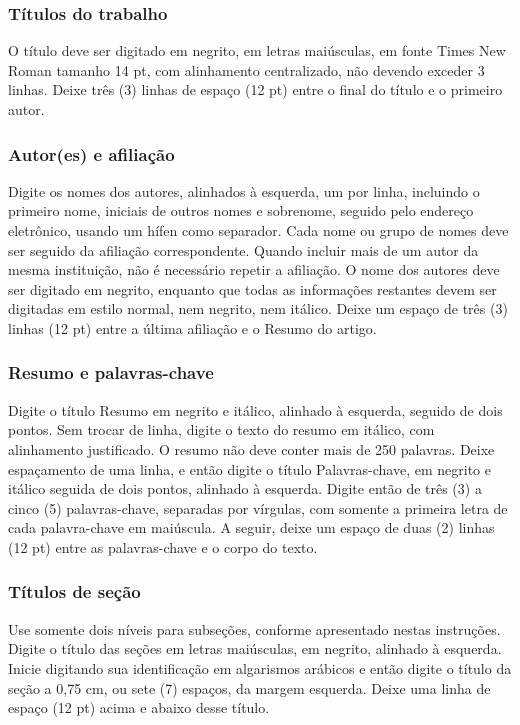 \documentclass[12pt,a4paper]{article}
\begin{document}
\subsubsection{Títulos do trabalho}
O título deve ser digitado em negrito, em letras maiúsculas, em fonte Times New Roman tamanho 14 pt, com alinhamento centralizado, não devendo exceder 3 linhas. Deixe três (3) linhas de espaço (12 pt) entre o final do título e o primeiro autor.

\subsubsection{Autor(es) e afiliação}
Digite os nomes dos autores, alinhados à esquerda, um por linha, incluindo o primeiro nome, iniciais de outros nomes e sobrenome, seguido pelo endereço eletrônico, usando um hífen como separador. Cada nome ou grupo de nomes deve ser seguido da afiliação correspondente. Quando incluir mais de um autor da mesma instituição, não é necessário repetir a afiliação. O nome dos autores deve ser digitado em negrito, enquanto que todas as informações restantes devem ser digitadas em estilo normal, nem negrito, nem itálico. Deixe um espaço de três (3) linhas (12 pt) entre a última afiliação e o Resumo do artigo.

\subsubsection{Resumo e palavras-chave}
Digite o título Resumo em negrito e itálico, alinhado à esquerda, seguido de dois pontos. Sem trocar de linha, digite o texto do resumo em itálico, com alinhamento justificado. O resumo não deve conter mais de 250 palavras. Deixe espaçamento de uma linha, e então digite o título Palavras-chave, em negrito e itálico seguida de dois pontos, alinhado à esquerda. Digite então de três (3) a cinco (5) palavras-chave, separadas por vírgulas, com somente a primeira letra de cada palavra-chave em maiúscula. A seguir, deixe um espaço de duas (2) linhas (12 pt) entre as palavras-chave e o corpo do texto.

\subsubsection{Títulos de seção}
Use somente dois níveis para subseções, conforme apresentado nestas instruções. Digite o título das seções em letras maiúsculas, em negrito, alinhado à esquerda. Inicie digitando sua identificação em algarismos arábicos e então digite o título da seção a 0,75 cm, ou sete (7) espaços, da margem esquerda. Deixe uma linha de espaço (12 pt) acima e abaixo desse título.
\end{document}
